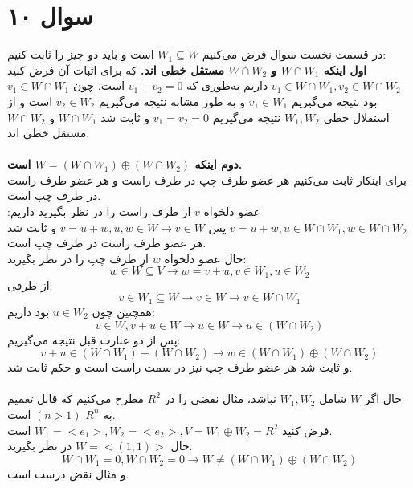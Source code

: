 \documentclass[12pt,a4paper]{article}
\begin{document}
\section{سوال ۱۰}
در قسمت نخست سوال فرض می‌کنیم
$W_1 \subseteq W$ 
 است و 
 باید دو چیز را ثابت کنیم:
\\
\textbf{اول اینکه 
$W \cap W_1$
و 
$W \cap W_2$
مستقل خطی اند.}
که برای اثبات آن فرض کنید 
$v_1 \in W \cap W_1, v_2 \in W \cap W_2$
داریم به‌طوری که
$v_1 + v_2 = 0$
است.
چون 
$v_1 \in W \cap W_1$ 
بود نتیجه می‌گیریم 
$v_1 \in W_1$
و به طور مشابه نتیجه می‌گیریم 
$v_2 \in W_2$
است و از استقلال خطی $W_1, W_2$ نتیجه می‌گیریم 
$v_1 = v_2 = 0$
و ثابت شد $W \cap W_1$
و 
$W \cap W_2$
مستقل خطی اند.
\\\\
\textbf{دوم اینکه 
$W = (W \cap W_1) \oplus (W \cap W_2)$
است.}
\\
برای اینکار ثابت می‌کنیم هر عضو طرف چپ در طرف راست و هر عضو طرف راست در طرف چپ است.
\\
عضو دلخواه $v$ از طرف راست را در نظر بگیرید داریم:
$v = u + w, u \in W \cap W_1, w \in W \cap W_2$
پس
$v = u + w, u,w \in W \rightarrow v \in W$
و ثابت شد هر عضو طرف راست در طرف چپ است.
\\
حال عضو دلخواه $w$ از طرف چپ را در نظر بگیرید:
\[
w \in W \subseteq V \rightarrow w = v + u, v \in W_1, u \in W_2
\]
از طرفی:
\[
v \in W_1 \subseteq W \rightarrow v \in W
\rightarrow v \in W \cap W_1
\]
همچنین چون 
$u \in W_2$
بود داریم:
\[
v \in W, v+u \in W \rightarrow u \in W \rightarrow u \in (W \cap W_2)
\]
پس از دو عبارت قبل نتیجه می‌گیریم:
\[
v + u \in (W \cap W_1) + (W \cap W_2) \rightarrow
w \in (W \cap W_1) \oplus (W \cap W_2)
\]
و ثابت شد هر عضو طرف چپ نیز در سمت راست است و حکم ثابت شد.
\\
\\
حال اگر $W$ شامل $W_1, W_2$ نباشد، مثال نقضی را در $R^2$ مطرح می‌کنیم که قابل تعمیم به $R^n$ 
$(n > 1)$
 است.
\\
فرض کنید 
$W_1 = <e_1>, W_2 = <e_2>, V = W_1 \oplus W_2 = R^2$
است.
\\
حال
$W = <(1, 1)>$
در نظر بگیرید.
\[
W\cap W_1 = {0}, W \cap W_2 = {0} \rightarrow 
W \neq (W \cap W_1) \oplus (W \cap W_2)
\]
و مثال نقض درست است.
\end{document}
